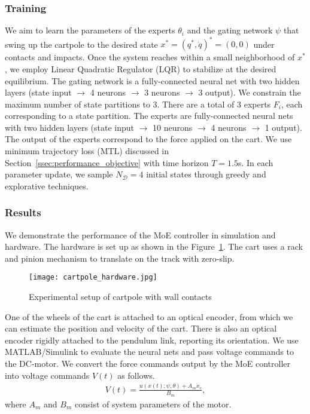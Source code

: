 \subsubsection{Training}
\label{sssec:cartpole_training}

We aim to learn the parameters of the experts $\theta_i$ and the gating network
$\psi$ that swing up the cartpole to the desired state $x^* = (q^*, \dot{q})^* =
(0, 0)$ under contacts and impacts.
%
Once the system reaches within a small neighborhood of $x^*$, we employ Linear
Quadratic Regulator (LQR) to stabilize at the desired equilibrium.
%
The gating network is a fully-connected neural net with two hidden layers (state
input $\rightarrow$ 4 neurons $\rightarrow$ 3 neurons $\rightarrow$  3 output).
% 
We constrain the maximum number of state partitions to 3.
%
There are a total of 3 experts $F_i$, each corresponding to a state
partition.
%
The experts are fully-connected neural nets with two hidden layers (state input
$\rightarrow$ 10 neurons $\rightarrow$ 4 neurons $\rightarrow$  1 output).
%
The output of the experts correspond to the force applied on the cart.
%
We use minimum trajectory loss (MTL) discussed in
Section~\ref{ssec:performance_objective} with time horizon $T=1.5$s.
%
In each parameter update, we sample $N_{\mathcal{D}}=4$ initial states through
greedy and explorative techniques.
%

\subsubsection{Results}

We demonstrate the performance of the MoE controller in simulation and hardware. 
%
The hardware is set up as shown in the Figure~\ref{fig:cartpole_hardware}.
% 
The cart uses a rack and pinion mechanism to translate on the track with
zero-slip.
%
\begin{figure}[tb]
    \centering
    \texttt{[image: cartpole\_hardware.jpg]}
    \caption{Experimental setup of cartpole with wall contacts}
    \label{fig:cartpole_hardware}
\end{figure}
One of the wheels of the cart is attached to an optical encoder, from which we
can estimate the position and velocity of the cart.
%
There is also an optical encoder rigidly attached to the pendulum link,
reporting its orientation. 
%
%
We use MATLAB/Simulink to evaluate the neural nets and pass voltage commands to
the DC-motor.
%
We convert the force commands output by the MoE controller into voltage
commands $V(t)$ as follows.
\begin{align*}
    V(t) = \frac{u(x(t); \psi, \theta) + A_m \dot{x}_c}{B_m},
\end{align*} 
\noindent where $A_m$ and $B_m$ consist of system parameters of the motor.

